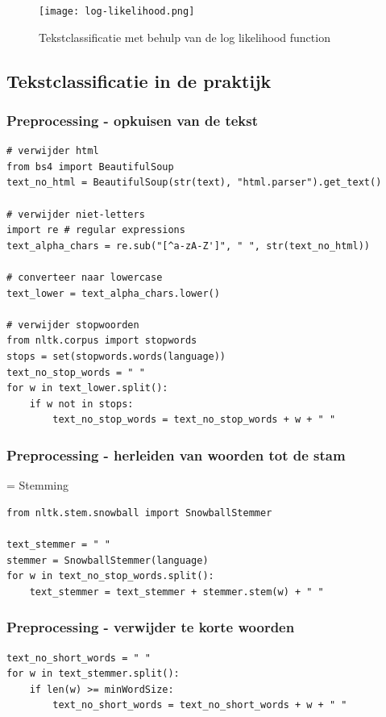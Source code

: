 \documentclass{article}
\begin{document}
\begin{figure}[H]
    \centering
    \texttt{[image: log-likelihood.png]}
    \caption{Tekstclassificatie met behulp van de log likelihood function}
\end{figure}

\subsection{Tekstclassificatie in de praktijk}

\subsubsection{Preprocessing - opkuisen van de tekst}

\begin{verbatim}
# verwijder html
from bs4 import BeautifulSoup
text_no_html = BeautifulSoup(str(text), "html.parser").get_text()

# verwijder niet-letters
import re # regular expressions
text_alpha_chars = re.sub("[^a-zA-Z']", " ", str(text_no_html))

# converteer naar lowercase
text_lower = text_alpha_chars.lower()

# verwijder stopwoorden
from nltk.corpus import stopwords
stops = set(stopwords.words(language))
text_no_stop_words = " "
for w in text_lower.split():
    if w not in stops:
        text_no_stop_words = text_no_stop_words + w + " "
\end{verbatim}

\subsubsection{Preprocessing - herleiden van woorden tot de stam}

= Stemming

\begin{verbatim}
from nltk.stem.snowball import SnowballStemmer

text_stemmer = " "
stemmer = SnowballStemmer(language)
for w in text_no_stop_words.split():
    text_stemmer = text_stemmer + stemmer.stem(w) + " "
\end{verbatim}

\subsubsection{Preprocessing - verwijder te korte woorden}

\begin{verbatim}
text_no_short_words = " "
for w in text_stemmer.split():
    if len(w) >= minWordSize:
        text_no_short_words = text_no_short_words + w + " "
\end{verbatim}
\end{document}
